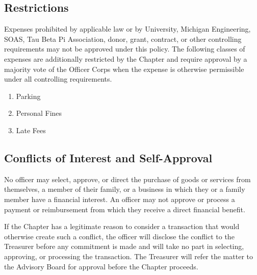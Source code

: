 \subsection{Restrictions} \label{III.5}
Expenses prohibited by applicable law or by University, Michigan Engineering, SOAS, Tau Beta Pi Association, donor, grant, contract, 
or other controlling requirements may not be approved under this policy. 
The following classes of expenses are additionally restricted by the Chapter and require approval by a majority vote of the Officer Corps 
when the expense is otherwise permissible under all controlling requirements.
\begin{enumerate}
    \item Parking
    \item Personal Fines
    \item Late Fees
\end{enumerate}

\subsection{Conflicts of Interest and Self-Approval} \label{III.6}
No officer may select, approve, or direct the purchase of goods or services from themselves, a member of their family, or a business in which they or a family member have a financial interest. 
An officer may not approve or process a payment or reimbursement from which they receive a direct financial benefit.

If the Chapter has a legitimate reason to consider a transaction that would otherwise create such a conflict, 
the officer will disclose the conflict to the Treasurer before any commitment is made and will take no part in selecting, approving, or processing the transaction. 
The Treasurer will refer the matter to the Advisory Board for approval before the Chapter proceeds.

